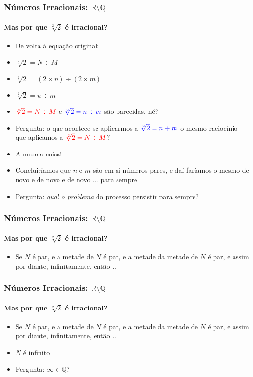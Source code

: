 \documentclass[usenames,dvipsnames,svgnames]{beamer}
\begin{document}
\begin{frame}	
	\frametitle{Números Irracionais: $\mathbb{R} \setminus \mathbb{Q}$}
	\framesubtitle{Mas {\color{red}por que} $\sqrt[2]{2}$ é irracional?}

	\begin{itemize}
		\item De volta à equação original:
		\item $\sqrt[2]{2} = N \div M$
		\item $\sqrt[2]{2} = (2 \times n) \div (2 \times m)$
		\item $\sqrt[2]{2} = n \div m$
		\item ${\color{red}\sqrt[2]{2} = N \div M}$ e ${\color{blue}\sqrt[2]{2} = n \div m}$ são parecidas, né?
		\item Pergunta: o que acontece se aplicarmos a ${\color{blue}\sqrt[2]{2} = n \div m}$ o mesmo raciocínio que aplicamos a ${\color{red}\sqrt[2]{2} = N \div M}$?
		\item A mesma coisa!
		\item Concluiríamos que $n$ e $m$ são em si números pares, e daí faríamos o mesmo de novo e de novo e de novo ... para sempre
		\item Pergunta: \emph{qual o problema} do processo persistir para sempre?
	\end{itemize}
\end{frame}

\begin{frame}	
	\frametitle{Números Irracionais: $\mathbb{R} \setminus \mathbb{Q}$}
	\framesubtitle{Mas {\color{red}por que} $\sqrt[2]{2}$ é irracional?}

	\begin{itemize}
		\item Se $N$ é par, e a metade de $N$ é par, e a metade da metade de $N$ é par, e assim por diante, infinitamente, então ...
	\end{itemize}
\end{frame}

\begin{frame}	
	\frametitle{Números Irracionais: $\mathbb{R} \setminus \mathbb{Q}$}
	\framesubtitle{Mas {\color{red}por que} $\sqrt[2]{2}$ é irracional?}

	\begin{itemize}
		\item Se $N$ é par, e a metade de $N$ é par, e a metade da metade de $N$ é par, e assim por diante, infinitamente, então ...
		\item $N$ é {\color{red} infinito}
		\item Pergunta: $\infty \in \mathbb{Q}$?
	\end{itemize}
\end{frame}
\end{document}
